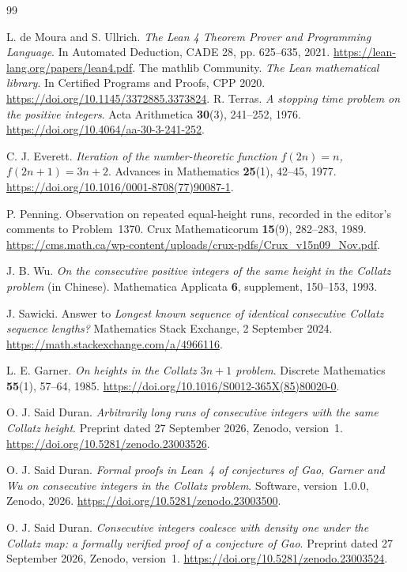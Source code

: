 \documentclass[11pt,a4paper]{article}
\begin{document}
\begin{thebibliography}{99}\small\raggedright
{} L. de Moura and S. Ullrich.
\emph{The Lean 4 Theorem Prover and Programming Language}.
In Automated Deduction, CADE 28, pp. 625--635, 2021.
\url{https://lean-lang.org/papers/lean4.pdf}.
 The mathlib Community.
\emph{The Lean mathematical library}.
In Certified Programs and Proofs, CPP 2020.
\url{https://doi.org/10.1145/3372885.3373824}.
 R. Terras.
\emph{A stopping time problem on the positive integers}.
Acta Arithmetica \textbf{30}(3), 241--252, 1976.
\url{https://doi.org/10.4064/aa-30-3-241-252}.

 C. J. Everett.
\emph{Iteration of the number-theoretic function
$f(2n)=n$, $f(2n+1)=3n+2$}.
Advances in Mathematics \textbf{25}(1), 42--45, 1977.
\url{https://doi.org/10.1016/0001-8708(77)90087-1}.

 P. Penning.
Observation on repeated equal-height runs, recorded in the editor's
comments to Problem~1370.
Crux Mathematicorum \textbf{15}(9), 282--283, 1989.
\url{https://cms.math.ca/wp-content/uploads/crux-pdfs/Crux_v15n09_Nov.pdf}.

 J. B. Wu.
\emph{On the consecutive positive integers of the same height in the
Collatz problem} (in Chinese).
Mathematica Applicata \textbf{6}, supplement, 150--153, 1993.

 J. Sawicki.
Answer to \emph{Longest known sequence of identical consecutive
Collatz sequence lengths?}
Mathematics Stack Exchange, 2 September 2024.
\url{https://math.stackexchange.com/a/4966116}.

 L. E. Garner.
\emph{On heights in the Collatz $3n+1$ problem}.
Discrete Mathematics \textbf{55}(1), 57--64, 1985.
\url{https://doi.org/10.1016/S0012-365X(85)80020-0}.

 O. J. Said Duran.
\emph{Arbitrarily long runs of consecutive integers with the same Collatz height}.
Preprint dated 27 September 2026, Zenodo, version~1.
\url{https://doi.org/10.5281/zenodo.23003526}.

 O. J. Said Duran.
\emph{Formal proofs in Lean~4 of conjectures of Gao, Garner and Wu
on consecutive integers in the Collatz problem}.
Software, version~1.0.0, Zenodo, 2026.
\url{https://doi.org/10.5281/zenodo.23003500}.

 O. J. Said Duran.
\emph{Consecutive integers coalesce with density one under the Collatz map:
a formally verified proof of a conjecture of Gao}.
Preprint dated 27 September 2026, Zenodo, version~1.
\url{https://doi.org/10.5281/zenodo.23003524}.


\end{thebibliography}
\end{document}
